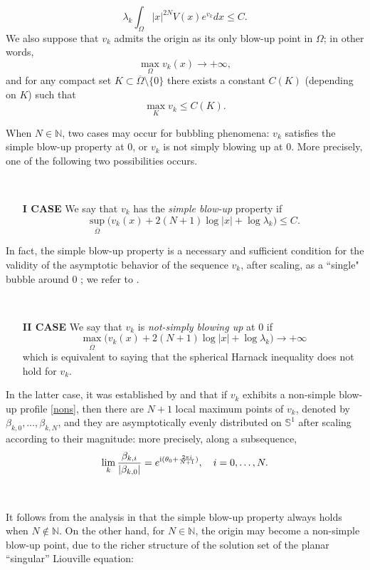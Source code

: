 \documentclass[reqno,11pt]{amsart}
\theoremstyle{definition}
\numberwithin{equation}{section}
\newcommand{\esse}{\mathbb{S}}
\newcommand{\N}{\mathbb{N}}
\newcommand{\la}{\lambda}
\renewcommand{\(}{\left(}
\renewcommand{\)}{\right)}
\renewcommand{\[}{\left[}
\renewcommand{\]}{\right]}
\newcommand{\beq}{\begin{equation}}
\newcommand{\eeq}{\end{equation}}
\begin{document}
\beq\label{unifbound}\la_k\int_\Omega |x|^{2N}V(x)e^{v_k}dx\leq C.\eeq
We also suppose that $v_k$ admits the origin as its only blow-up point in $\Omega$; in other words,
\beq\label{eqq000}\max_{\Omega} v_k(x)\to +\infty,  \eeq
and 
 for any compact set  $K\subset\overline{\Omega}\setminus\{0\}$ there exists a constant $C(K)$ (depending on $K$) such that 
\beq\label{eqq0000}\max_{K}v_k\leq C(K).\eeq 

When $N\in\N$, two cases may occur for bubbling phenomena: $v_k$ satisfies the simple blow-up property at $0$, or $v_k$ is not simply blowing up at $0$. More precisely, one of the following two possibilities occurs.

\

\begin{enumerate}
\item[{\bf{I CASE}}] We say that $v_k$ has the \textit{simple blow-up} property if 
\beq\label{simple}\sup_{\overline{\Omega}}\Big(v_k(x)+2(N+1)\log |x|+\log\la_k\Big) \leq C.\eeq
\end{enumerate}
In fact, the simple blow-up property is a necessary and sufficient condition for the validity of the asymptotic behavior of the sequence $v_k$, after scaling, as a “single" bubble around $0$
; we refer to \cite{selfdual}.

\

\begin{itemize}
\item[{\bf{II CASE}}] We say that $v_k$ is \textit{not-simply blowing up} at $0$  if 
\beq\label{nons}\max_{\overline\Omega}\Big(v_k(x)+2(N+1)\log|x| +\log\la_k\Big)\to +\infty\eeq which is equivalent to saying that the spherical Harnack inequality does not hold for $v_k$.\end{itemize}

 In the latter case, 
  it was established by   \cite{bata} and \cite{KuoLin}  that
 if $v_k$ exhibits a non-simple blow-up profile \eqref{nons},  then  there are $N+1$ local maximum points of $v_k$, denoted by  $\beta_{k,0},\ldots, \beta_{k,N}$, and they are asymptotically evenly distributed on $\esse^1$ after scaling according to their magnitude: more precisely, along a subsequence,
$$%
\lim_k\frac{\beta_{k,i}}{|\beta_{k,0}|}=e^{{\rm i}(\theta_0+\frac{2\pi i}{N+1})}, \quad i=0,\ldots, N.$$

\

It follows from the analysis in \cite{selfdual} that the simple blow-up property  always holds when $N\not\in \N$. On the other hand, for $N\in\N$, the origin may become a non-simple blow-up point, due to the richer structure of the solution set of the planar “singular” Liouville equation:
\end{document}
